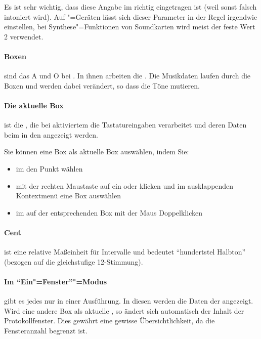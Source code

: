 {  Es ist sehr wichtig, dass diese Angabe im
   richtig eingetragen ist (weil
  sonst falsch intoniert wird). Auf
  "=Geräten lässt sich dieser Parameter in
  der Regel irgendwie einstellen, bei Synthese"=Funktionen von
  Soundkarten wird meist der feste Wert 2 verwendet.

\paragraph{Boxen}\label{sec:DV_BOX} sind das A und O bei
  \mutabor[~3]. In ihnen arbeiten die
  . Die Musikdaten
  laufen durch die Boxen und werden dabei verändert, so dass die Töne
  mutieren.

\paragraph{Die aktuelle Box}\label{sec:DV_CURRENTBOX} ist die
  , die bei aktiviertem
   die Tastatureingaben
  verarbeitet und deren Daten beim  in den
   angezeigt werden.

  Sie können eine Box als aktuelle Box auswählen, indem Sie:
  \begin{itemize}
  \item im  den Punkt
     wählen
  \item mit der rechten Maustaste auf ein
     oder
     klicken und im
    ausklappenden Kontextmenü eine Box auswählen
  \item im  auf der
    entsprechenden Box mit der Maus Doppelklicken
  \end{itemize}

\paragraph{Cent}\label{sec:DV_CENT} ist eine relative
  Maßeinheit für Intervalle und bedeutet "`hundertstel Halbton"'
  (bezogen auf die gleichstufige 12-Stimmung).

\paragraph{Im "`Ein"=Fenster"'"=Modus}\label{sec:DV_OWM} gibt es
  jedes  nur in einer
  Ausführung. In diesen werden die Daten der
   angezeigt. Wird
  eine andere Box als aktuelle , so ändert sich automatisch der Inhalt der
  Protokollfenster. Dies gewährt eine gewisse Übersichtlichkeit, da
  die Fensteranzahl begrenzt ist.

}
